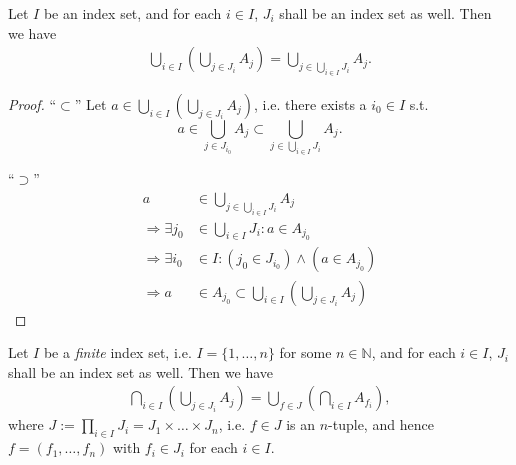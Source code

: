\begin{theorem}\label{thrm:union_of_union_of_sets}
	Let $I$ be an index set, and for each $i\in I$, $J_i$ shall be an index set as well. Then we have \cite{878108}
	\begin{align}
		\bigcup_{i\in I}\left(\bigcup_{j\in J_i}A_j\right) = \bigcup_{j\in\bigcup_{i\in I}J_i}A_j.
	\end{align}		
\end{theorem}

\begin{proof}
	\enquote{$\subset$} Let $a\in \bigcup_{i\in I}\left(\bigcup_{j\in J_i}A_j\right)$, i.e. there exists a $i_0\in I$ s.t. $$a\in \bigcup_{j\in J_{i_0}}A_j\subset \bigcup_{j\in \bigcup_{i\in I}J_i}A_j.$$ 
	
	\enquote{$\supset$} 
	\begin{align*}
		a&\in \bigcup_{j\in\bigcup_{i\in I}J_i}A_j 
		\\ \Rightarrow \exists j_0&\in \bigcup_{i\in I}J_i: a\in A_{j_0}
		\\ \Rightarrow \exists i_0&\in I: \left(j_0\in J_{i_0}\right) \wedge \left(a\in A_{j_0}\right)
		\\ \Rightarrow a&\in A_{j_0}\subset \bigcup_{i\in I}\left(\bigcup_{j\in J_i}A_j\right)
	\end{align*}
\end{proof}

\begin{theorem}\label{thrm:finite_intersec_of_union_of_sets}
	Let $I$ be a \textit{finite} index set, i.e. $I = \{1, \dots, n\}$ for some $n\in \mathbb N$, and for each $i\in I$, $J_i$ shall be an index set as well. Then we have
	\begin{align}\label{eq:finite_intersec_of_union_of_sets}
		\bigcap_{i\in I}\left(\bigcup_{j\in J_i}A_j\right) = \bigcup_{f\in J}\left(\bigcap_{i\in I}A_{f_i}\right),
	\end{align}
	where $J := \prod_{i\in I}J_i = J_1\times \dots\times J_n$, i.e. $f\in J$ is an $n$-tuple, and hence $f = (f_1, \dots, f_n)$ with $f_i\in J_i$ for each $i\in I$.
\end{theorem}

